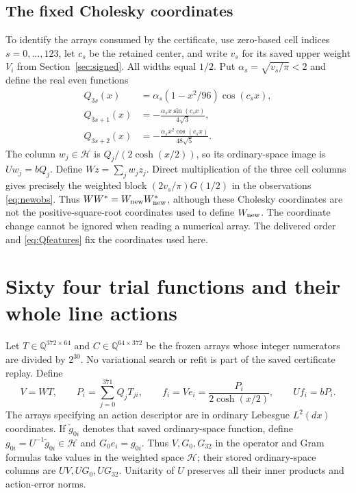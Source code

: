 \documentclass[11pt,a4paper]{article}
\numberwithin{equation}{section}
\theoremstyle{definition}\newtheorem{definition}[theorem]{Definition}
\theoremstyle{remark}\newtheorem{remark}[theorem]{Remark}
\newcommand{\HH}{\mathcal H}
\newcommand{\Q}{\mathbb Q}
\begin{document}
\subsection{The fixed Cholesky coordinates}
To identify the arrays consumed by the certificate, use zero-based cell indices $s=0,\ldots,123$, let $c_s$ be the retained center, and write $v_s$ for its saved upper weight $V_i$ from Section~\ref{sec:signed}. All widths equal $1/2$. Put $\alpha_s=\sqrt{v_s/\pi}<2$ and define the real even functions
\begin{align}\label{eq:Qfeatures}
 Q_{3s}(x)&=\alpha_s(1-x^2/96)\cos(c_sx),\nonumber\\
 Q_{3s+1}(x)&=-\frac{\alpha_s x\sin(c_sx)}{4\sqrt3},\\
 Q_{3s+2}(x)&=-\frac{\alpha_s x^2\cos(c_sx)}{48\sqrt5}.\nonumber
\end{align}
The column $w_j\in\HH$ is $Q_j/(2\cosh(x/2))$, so its ordinary-space image is $Uw_j=bQ_j$. Define $Wz=\sum_jw_jz_j$. Direct multiplication of the three cell columns gives precisely the weighted block $(2v_s/\pi)G(1/2)$ in the observations \eqref{eq:newobs}. Thus $WW^*=W_{\rm new}W_{\rm new}^*$, although these Cholesky coordinates are not the positive-square-root coordinates used to define $W_{\rm new}$. The coordinate change cannot be ignored when reading a numerical array. The delivered order and \eqref{eq:Qfeatures} fix the coordinates used here.

\section{Sixty four trial functions and their whole line actions}\label{sec:trial64}
Let $T\in\Q^{372\times64}$ and $C\in\Q^{64\times372}$ be the frozen arrays whose integer numerators are divided by $2^{30}$. No variational search or refit is part of the saved certificate replay. Define
\begin{equation}\label{eq:trial64}
 V=WT,\qquad P_i=\sum_{j=0}^{371}Q_jT_{ji},\qquad
 f_i=Ve_i=\frac{P_i}{2\cosh(x/2)},\qquad Uf_i=bP_i.
\end{equation}
The arrays specifying an action descriptor are in ordinary Lebesgue $L^2(dx)$ coordinates. If $\widetilde g_{0i}$ denotes that saved ordinary-space function, define $g_{0i}=U^{-1}\widetilde g_{0i}\in\HH$ and $G_0e_i=g_{0i}$. Thus $V,G_0,G_{32}$ in the operator and Gram formulas take values in the weighted space $\HH$; their stored ordinary-space columns are $UV,UG_0,UG_{32}$. Unitarity of $U$ preserves all their inner products and action-error norms.
\end{document}
